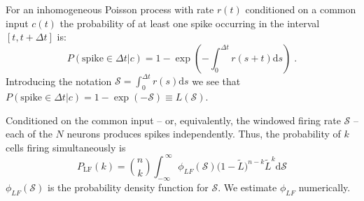 \documentclass[%
 reprint,
 amsmath,amssymb,
 aps,
floatfix,
]{revtex4-1}
\newcommand{\dd}{\mathrm{d}}
\begin{document}
%
%
%
%

For an inhomogeneous Poisson process with rate $r(t)$ conditioned on a common input $c(t)$ the probability of at least one spike occurring in the interval $[t,t+\Delta t]$ is:
\begin{equation*}
P(\text{spike}\in\Delta t | c ) = 1 - \exp{\left(-\int_0^{\Delta t} \! r(s+t) \dd s \right)} \;.
\end{equation*}
Introducing the notation  $\mathcal{S} = \int_0^{\Delta t} \! r(s) \dd s $ we see that $P(\text{spike}\in\Delta t | c ) = 1 - \exp (-\mathcal{S}) \equiv L(\mathcal{S})$.  

Conditioned on the common input -- or, equivalently, the windowed firing rate $\mathcal{S}$ -- each of the $N$ neurons produces spikes independently.  Thus, the probability of $k$ cells firing simultaneously is
\begin{equation}
P_{\text{LF}}(k) = \binom{n}{k} \int_{-\infty}^{~\infty} \phi_{LF}(\mathcal{S}) \big(1-\tilde{L}\big)^{n-k} \tilde{L}^{k} \dd \mathcal{S}
\end{equation}
$\phi_{LF}(\mathcal{S})$ is the probability density function for $\mathcal{S}$.  We estimate $\phi_{LF}$ numerically.
\end{document}
